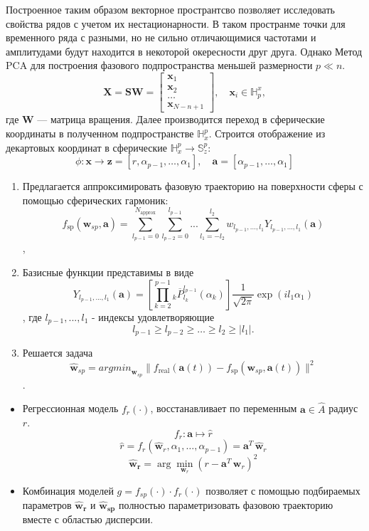 Построенное таким образом векторное пространтсво позволяет исследовать свойства рядов с учетом их нестационарности. В таком пространме точки для временного ряда с разными, но не сильно отличающимися частотами и амплитудами будут находится в некоторой окересности друг друга.
Однако Метод PCA для построения фазового подпространства меньшей размерности $p \ll n$.
\[\mathbf{X} = \mathbf{S W} =
    \begin{bmatrix}
        \mathbf{x}_1 \\
        \mathbf{x}_2  \\
        \dots \\
        \mathbf{x}_{N-n+1}
    \end{bmatrix},
    \quad
    \mathbf{x}_{i} \in \mathbb{H}_{p}^{x},\]
    где $\mathbf{W}$ --- матрица вращения.
Далее производится переход в сферические координаты в полученном подпространстве $\mathbb{H}_{x}^{p}$.
Строится отображение из декартовых координат в сферические $\mathbb{H}_{x}^{p} \xrightarrow{} \mathbb{S}_{z}^{p}$:
\[
    \phi: \mathbf{x} \xrightarrow{} \mathbf{z} = [r,\alpha_{p-1},\dots,\alpha_1],
    \quad
    \mathbf{a} = [\alpha_{p-1},\dots,\alpha_1]
\]

\begin{enumerate}
    \item Предлагается аппроксимировать фазовую траекторию на поверхности сферы с помощью сферических гармоник:
        \[f_{\text{sp}}(\mathbf{w}_{sp},\mathbf{a}) = \sum_{l_{p-1} = 0}^{N_{\text{approx}}}\sum_{l_{p-2} = 0}^{l_{p-1}}...\sum_{l_1 = -l_2}^{l_2}
        w_{l_{p-1},...,l_1} Y_{l_{p-1},...,l_1}(\mathbf{a})\],
    
    \item Базисные функции представимы в виде     \[Y_{l_{p-1},...,l_1}(\mathbf{a}) = 
        \left[\prod\limits_{k = 2}^{p-1}{_k}{\overline{P}}_{l_k}^{l_{p-1}}(\alpha_k)\right]
        \frac{1}{\sqrt{2\pi}}
        \exp{(i l_1 \alpha_1)}\],
        где $l_{p-1},...,l_1$ - индексы удовлетворяющие
        \[l_{p-1} \geq l_{p-2} \geq \dots \geq l_2 \geq|l_1|.\]
    
    \item Решается задача 
        \[\mathbf{\hat{w}}_{sp} = {argmin}_{\mathbf{w}_{sp}}
        \|f_{\text{real}}(\mathbf{a}(t)) - f_{\text{sp}}(\mathbf{w}_{sp},\mathbf{a}(t))\|^2\].
\end{enumerate}

\begin{itemize}
\item Регрессионная модель $f_r(\cdot)$, восстанавливает по переменным $\mathbf{a} \in \hat{A}$ радиус $r$.
\[
    f_r: \mathbf{a}
    \mapsto
    \hat{r}
\]
\[
\hat{r} = f_r(\mathbf{\hat{w}}_r,\alpha_{1},\dots, \alpha_{p-1}) = \mathbf{a}^T\,\mathbf{\hat{w}}_r
\]
\[
\mathbf{\hat{w}_r} = \arg\min_{\mathbf{w}_r}(r - \mathbf{a}^T\,\mathbf{w}_r)^2
\]

\item Комбинация моделей  $ g = f_{sp}(\cdot)\cdot f_r(\cdot)$ позволяет с помощью подбираемых параметров $\mathbf{\hat{w}_r}$ и $\mathbf{\hat{w}_{sp}}$ полностью параметризовать фазовою траекторию вместе с областью дисперсии.
\end{itemize}
